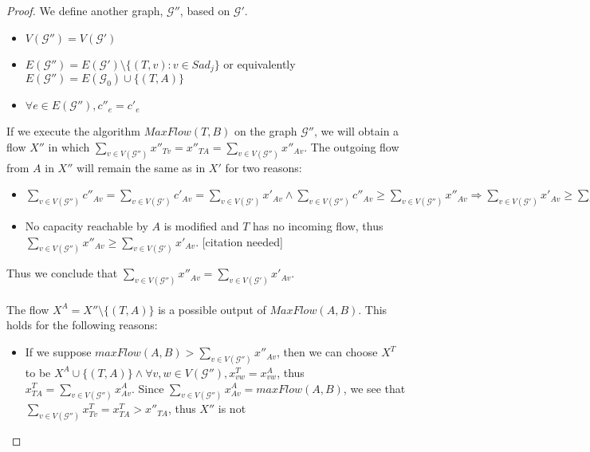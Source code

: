 \documentclass[11pt]{article}
\theoremstyle{definition}
\theoremstyle{corollary}
\theoremstyle{lemma}
\begin{document}
\begin{proof}
       We define another graph, $\mathcal{G}''$, based on $\mathcal{G}'$.
       \begin{itemize}
          \item $V(\mathcal{G}'') = V(\mathcal{G}')$
          \item $E(\mathcal{G}'') = E(\mathcal{G}') \setminus \{(T, v) : v \in Sad_j\}$ or equivalently $E(\mathcal{G}'') =
          E(\mathcal{G}_0) \cup \{(T, A)\}$
          \item $\forall e \in E(\mathcal{G}''), c''_e = c'_e$
       \end{itemize}
       If we execute the algorithm $MaxFlow(T, B)$ on the graph $\mathcal{G}''$, we will obtain a flow $X''$ in which
       $\sum\limits_{v \in V(\mathcal{G}'')}x''_{Tv} = x''_{TA} = \sum\limits_{v \in V(\mathcal{G}'')}x''_{Av}$. The outgoing
       flow from $A$ in $X''$ will remain the same as in $X'$ for two reasons:
       \begin{itemize}
          \item $\sum\limits_{v \in V(\mathcal{G}'')}c''_{Av} = \sum\limits_{v \in V(\mathcal{G}')}c'_{Av} = \sum\limits_{v
          \in V(\mathcal{G}')}x'_{Av} \wedge \sum\limits_{v \in V(\mathcal{G}'')}c''_{Av} \geq \sum\limits_{v \in
          V(\mathcal{G}'')}x''_{Av} \Rightarrow \sum\limits_{v \in V(\mathcal{G}')}x'_{Av} \geq \sum\limits_{v \in
          V(\mathcal{G}'')}x''_{Av}$
          \item No capacity reachable by $A$ is modified and $T$ has no incoming flow, thus $\sum\limits_{v \in
          V(\mathcal{G}'')}x''_{Av} \geq \sum\limits_{v \in V(\mathcal{G}')}x'_{Av}$. [citation needed]
       \end{itemize}
       Thus we conclude that $\sum\limits_{v \in V(\mathcal{G}'')}x''_{Av} = \sum\limits_{v \in V(\mathcal{G}')}x'_{Av}$. \\
       \ \\ The flow $X^A = X'' \setminus \{(T, A)\}$ is a possible output of $MaxFlow(A, B)$. This holds for the following
       reasons:
       \begin{itemize}
          \item If we suppose $maxFlow(A, B) > \sum\limits_{v \in V(\mathcal{G}'')}x''_{Av}$, then we can choose $X^T$ to be
          $X^A \cup \{(T, A)\} \wedge \forall v, w \in V(\mathcal{G}''), x^T_{vw} = x^A_{vw}$, thus $x^T_{TA} =
          \sum\limits_{v \in V(\mathcal{G}'')}x^A_{Av}$. Since $\sum\limits_{v \in V(\mathcal{G}'')}x^A_{Av} =
          maxFlow(A, B)$, we see that $\sum\limits_{v \in V(\mathcal{G}'')}x^T_{Tv} = x^T_{TA} > x''_{TA}$, thus $X''$ is not

\end{itemize}
\end{proof}
\end{document}
